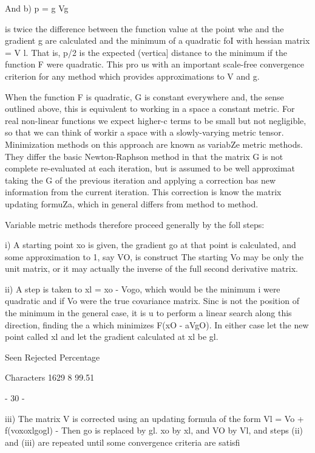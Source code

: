 And                       b)    p = g Vg
 
is twice the difference between the function value at the point whe
and the gradient g are calculated and the minimum of a quadratic foI
with hessian matrix  = V l.  That is, p/2 is the expected (vertica]
distance to the minimum if the function F were quadratic.  This pro
us with an important scale-free convergence criterion for any method
which provides approximations to V and g.
 
     When the function F is quadratic, G is constant everywhere and,
the sense outlined above, this is equivalent to working in a space 
a constant metric.  For real non-linear functions we expect higher-c
terms to be small but not negligible, so that we can think of workir
a space with a slowly-varying metric tensor.  Minimization methods
on this approach are known as variabZe metric methods.  They differ
the basic Newton-Raphson method in that the matrix G is not complete
re-evaluated at each iteration, but is assumed to be well approximat
taking the G of the previous iteration and applying a correction bas
new information from the current iteration.  This correction is know
the matrix updating formuZa, which in general differs from method to
method.
 
     Variable metric methods therefore proceed generally by the foll
steps:
 
  i) A starting point xo is given, the gradient go at that point is
     calculated, and some approximation to  1, say VO, is construct
     The starting Vo may be only the unit matrix, or it may actually
     the inverse of the full second derivative matrix.
 
 ii) A step is taken to xl = xo - Vogo, which would be the minimum i
     were quadratic and if Vo were the true covariance matrix.  Sinc
     is not the position of the minimum in the general case, it is u
     to perform a linear search along this direction, finding the a
     which minimizes F(xO - aVgO).  In either case let the new point
     called xl and let the gradient calculated at xl be gl.
 
                 Seen Rejected  Percentage
 
Characters       1629        8   99.51
 
                                 - 30 -
 
 
iii) The matrix V is corrected using an updating formula of the form
                       Vl = Vo + f(voxoxlgogl) -
     Then go is replaced by gl. xo by xl, and VO by Vl, and steps (ii)
     and (iii) are repeated until some convergence criteria are satisfi
 
